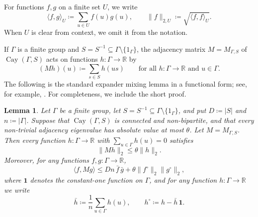 \documentclass[10pt]{article}
\numberwithin{equation}{section}
\newtheorem{lemma}[theorem]{Lemma}
\DeclareMathOperator{\Cay}{Cay}
\newcommand{\R}{\mathbb{R}}
\begin{document}
For functions $f,g$ on a finite set $U$, we write
\[
        \langle f,g\rangle_U\coloneqq \sum_{u\in U}f(u)g(u), \qquad \|f\|_{2,U}\coloneqq \sqrt{\langle f,f\rangle_U}.
\]
When $U$ is clear from context, we omit it from the notation.

If $\Gamma$ is a finite group and $S=S^{-1}\subseteq\Gamma\setminus\{1_\Gamma\}$, the adjacency matrix $M=M_{\Gamma,S}$ of $\Cay(\Gamma,S)$ acts on functions $h\colon\Gamma\to\R$ by
\[
        (Mh)(u)\coloneqq \sum_{s\in S}h(us) \qquad\text{for all } h\colon\Gamma\to\R\text{ and }u\in\Gamma.
\]
The following is the standard expander mixing lemma in a functional form; see, for example, \cite{Alon1986,Lubotzky2012}. For completeness, we include the short proof.

\begin{lemma}\label{lem:mixing}
Let $\Gamma$ be a finite group, let $S=S^{-1}\subseteq\Gamma\setminus\{1_\Gamma\}$, and put $D\coloneqq |S|$ and $n\coloneqq |\Gamma|$. Suppose that $\Cay(\Gamma,S)$ is connected and non-bipartite, and that every non-trivial adjacency eigenvalue has absolute value at most $\theta$. Let $M=M_{\Gamma,S}$. 
Then every function $h\colon\Gamma\to\R$ with $\sum_{u\in\Gamma}h(u)=0$ satisfies
\begin{equation}
        \|Mh\|_2\le \theta\|h\|_2 .
        \label{eq:spectral-L2-bound}
\end{equation}
Moreover, for any functions $f,g\colon\Gamma\to\R$,
\begin{equation}
        \langle f,Mg\rangle \le Dn\,\bar f\,\bar g+\theta\|f^\circ\|_2\|g^\circ\|_2,
        \label{eq:mixing}
\end{equation}
where $\mathbf 1$ denotes the constant-one function on $\Gamma$, and for any function $h\colon\Gamma\to\R$ we write
\[
        \bar h\coloneqq \frac1n\sum_{u\in\Gamma}h(u), \qquad h^\circ\coloneqq h-\bar h\,\mathbf 1 .
\]
\end{lemma}
\end{document}
